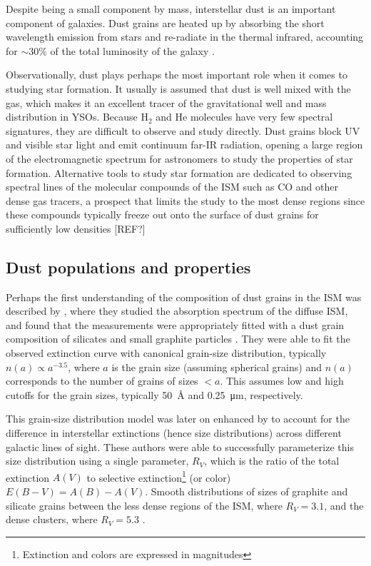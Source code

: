 Despite being a small component by mass, interstellar dust is an important component of galaxies. Dust grains are heated up by absorbing the short wavelength emission from stars and re-radiate in the thermal infrared, accounting for $\sim 30\%$ of the total luminosity of the galaxy \citep{Mathis:1990jk}. 

Observationally, dust plays perhaps the most important role when it comes to studying star formation. It usually is assumed that dust is well mixed with the gas, which makes it an excellent tracer of the gravitational well and mass distribution in YSOs. Because H$_2$ and He molecules have very few spectral signatures, they are difficult to observe and study directly. Dust grains block UV and visible star light and emit continuum far-IR radiation, opening a large region of the electromagnetic spectrum for astronomers to study the properties of star formation. Alternative tools to study star formation are dedicated to observing spectral lines of the molecular compounds of the ISM such as CO and other dense gas tracers, a prospect that limits the study to the most dense regions since these compounds typically freeze out onto the surface of dust grains for sufficiently low densities [REF?]%


\subsection{Dust populations and properties}


Perhaps the first understanding of the composition of dust grains in the ISM was described by \citet{Mathis:1977hp}, where they studied the absorption spectrum of the diffuse ISM, and found that the measurements were appropriately fitted with a dust grain composition of silicates and small graphite particles \citep{Stecher:1965eq}. They were able to fit the observed extinction curve with canonical grain-size distribution, typically $n(a) \propto a^{-3.5}$, where $a$ is the grain size (assuming spherical grains) and $n(a)$ corresponds to the number of grains of sizes $<a$. This assumes low and high cutoffs for the grain sizes, typically \SI{50}{\angstrom} and \SI{0.25}{\micro\meter}, respectively.

This grain-size distribution model was later on enhanced by \citet{Cardelli:1989dp} to account for the difference in interstellar extinctions (hence size distributions) across different galactic lines of sight. These authors were able to successfully parameterize this size distribution using a single parameter, $R_V$, which is the ratio of the total extinction $A(V)$ to selective extinction\footnote{Extinction and colors are expressed in magnitudes} (or color) $E(B-V) = A(B) - A(V)$. Smooth distributions of sizes of graphite and silicate grains between the less dense regions of the ISM, where $R_V = 3.1$, and the dense clusters, where $R_V = 5.3$ \citep{Kim:1994iu}. 

